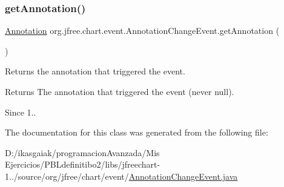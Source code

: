 \subsubsection{\texorpdfstring{get\+Annotation()}{getAnnotation()}}
{\footnotesize\ttfamily \mbox{\hyperlink{interfaceorg_1_1jfree_1_1chart_1_1annotations_1_1_annotation}{Annotation}} org.\+jfree.\+chart.\+event.\+Annotation\+Change\+Event.\+get\+Annotation (\begin{DoxyParamCaption}{ }\end{DoxyParamCaption})}

Returns the annotation that triggered the event.

\begin{DoxyReturn}{Returns}
The annotation that triggered the event (never {\ttfamily null}).
\end{DoxyReturn}
\begin{DoxySince}{Since}
1.. 
\end{DoxySince}


The documentation for this class was generated from the following file\+:\begin{DoxyCompactItemize}
\item 
D\+:/ikasgaiak/programacion\+Avanzada/\+Mis Ejercicios/\+P\+B\+Ldefinitibo2/libs/jfreechart-\/1../source/org/jfree/chart/event/\mbox{\hyperlink{_annotation_change_event_8java}{Annotation\+Change\+Event.\+java}}\end{DoxyCompactItemize}

